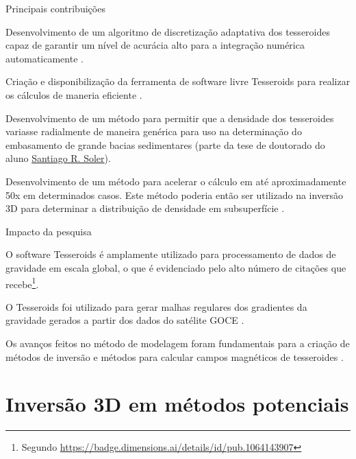 \documentclass[12pt,a4paper,oneside]{book}
\newcommand{\SantiagoLink}{\href{https://www.santisoler.com/}{Santiago R. Soler}}
\begin{document}
\begin{fancyenum}{\faLightbulb}{Principais contribuições}
  \item Desenvolvimento de um algoritmo de discretização adaptativa dos
    tesseroides capaz de garantir um nível de acurácia alto para a integração
    numérica automaticamente \citep{Uieda2016}.
  \item Criação e disponibilização da ferramenta de software livre Tesseroids
    para realizar os cálculos de maneria eficiente \citep{Uieda2016}.
  \item Desenvolvimento de um método para permitir que a densidade dos
    tesseroides variasse radialmente de maneira genérica \citep{Soler2019}
    para uso na determinação do embasamento de grande bacias sedimentares
    (parte da tese de doutorado do aluno \SantiagoLink{}).
  \item Desenvolvimento de um método para acelerar o cálculo
    em até aproximadamente 50x em determinados casos. Este método poderia então
    ser utilizado na inversão 3D para determinar a distribuição de densidade em
    subsuperfície \citep[][em colaboração com pesquisadores da Central
    South University, China, e GFZ Potsdam, Alemanha]{Zhao2019} .
\end{fancyenum}

\begin{fancyenum}{\faRocket}{Impacto da pesquisa}
  \item O software Tesseroids é amplamente utilizado para processamento de
    dados de gravidade em escala global, o que é evidenciado pelo alto número
    de citações que recebe\footnote{Segundo
    \url{https://badge.dimensions.ai/details/id/pub.1064143907}}.
  \item O Tesseroids foi utilizado para gerar malhas regulares dos gradientes da
    gravidade gerados a partir dos dados do satélite GOCE \citep{Bouman2016}.
  \item Os avanços feitos no método de modelagem foram fundamentais para a
    criação de métodos de inversão \citep{Uieda2017,Zhao2019} e métodos para
    calcular campos magnéticos de tesseroides \citep{Baykiev2016}.
\end{fancyenum}



\section{Inversão 3D em métodos potenciais}
\label{sec_planting}
\end{document}
